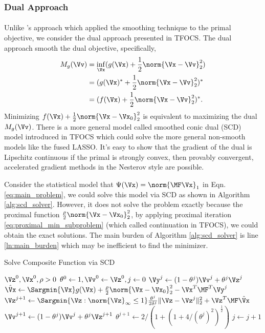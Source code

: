 \documentclass[
10pt, %
a4paper, %
oneside, %
headinclude,footinclude, %
BCOR5mm, %
]{scrartcl}
\begin{document}
\subsubsection{Dual Approach}
\paragraph{}
Unlike \citet{nesterov2005smooth}'s approach which applied the smoothing 
technique to the primal objective, we consider the dual approach presented in 
TFOCS\cite{becker2012tfocs}. The dual approach smooth the dual objective, 
specifically, 
\begin{align*}
	M_g(\Vv) &= \inf_{\Vx} (g(\Vx) + \frac{1}{2}\norm{\Vx-\Vv}_2^2) \nonumber \\
	&= (g(\Vx)^* + \frac{1}{2}\norm{\Vx-\Vv}_2^2)^* \nonumber \\
	&= (f(\Vx) + \frac{1}{2}\norm{\Vx-\Vv}_2^2)^*. \nonumber
\end{align*}
Minimizing $f(\Vx) + \frac{1}{2} \norm{\Vx-\Vx_0}_2^2 $ is equivalent to 
maximizing the dual $M_g(\Vv)$. There is a more general model called smoothed 
conic dual (SCD) model introduced in TFOCS \cite{becker2012tfocs} which could 
solve the more general non-smooth models like the fused LASSO.  It's easy to 
show that the gradient of the dual is Lipschitz continuous if the primal is 
strongly convex\cite{nesterov2005smooth}, then provably convergent, accelerated 
gradient methods in the Nesterov style are possible.

Consider the statistical model that $\Psi(\Vx) = \norm{\MF \Vx}_1 $ in Eqn. 
\eqref{eq:main_problem}, we could solve this model via SCD as shown 
in Algorithm \ref{alg:scd_solver}. However, it does not solve the problem 
exactly because the proximal function $ \frac{\rho}{2} \norm{\Vx-\Vx_0}_2^2 $, 
by applying proximal iteration \eqref{eq:proximal_min_subproblem} (which 
called continuation in TFOCS), we could obtain the exact solutions. The main 
burden of Algorithm \ref{alg:scd_solver} is line \ref{ln:main_burden} which may 
be inefficient to find the minimizer.

\begin{algorithm}[ht]
\caption{Solve Composite Function via SCD}\label{alg:scd_solver}
\begin{algorithmic}[1]
	\Require $ \Vz^0, \Vx^0, \rho > 0 $
	\State $ \theta^0 \gets 1, \Vv^0 \gets \Vz^0, j \gets 0 $
\Repeat
	\State $ \Vy^j \gets (1-\theta^j)\Vv^j + \theta^j \Vz^j $
	\State \label{ln:main_burden}
	$\hat{\Vx} \gets \Sargmin{\Vx} g(\Vx) + \frac{\rho}{2} \norm{\Vx-\Vx_0}_2^2
	- \Vx^T \MF^T\Vy^j $ 
	\State  $ \Vz^{j+1} \gets \Sargmin{\Vz: \norm{\Vz}_{\infty} \leq 1} 
	\frac{\theta^j}{2\delta^j}\|\Vz-\Vz^j\|_2^2 + \Vz^T \MF\hat{\Vx}  $
	\State  $ \Vv^{j+1} \gets (1-\theta^j)\Vv^j + \theta^j \Vz^{j+1}  $
 \State $ \theta^{j+1} \gets 2/(1+(1+4/(\theta^j)^2)^{\frac{1}{2}}) $
 \State $ j \gets j + 1 $
\end{algorithmic}
\end{algorithm}
\end{document}
